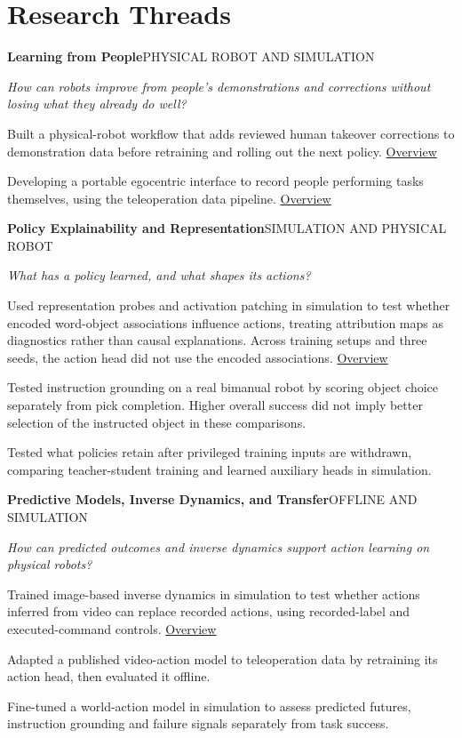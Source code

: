 \documentclass[10pt]{article}
\newcommand{\thread}[3]{\par\vspace{4pt}\textbf{#1}\hfill{\scriptsize #2}\par\textit{#3}\par}
\renewcommand{\evidence}[2]{\nobreak\hspace{0.15em}\mbox{\footnotesize\href{#1}{#2}}}
\begin{document}
\section{Research Threads}
\thread{Learning from People}{PHYSICAL ROBOT AND SIMULATION}{How can robots improve from people's demonstrations and corrections without losing what they already do well?}
\begin{compactitems}
\item Built a physical-robot workflow that adds reviewed human takeover corrections to demonstration data before retraining and rolling out the next policy. \evidence{https://tvpian.github.io/\#continual-learning}{Overview}
\item Developing a portable egocentric interface to record people performing tasks themselves, using the teleoperation data pipeline. \evidence{https://tvpian.github.io/\#egocentric}{Overview}
\end{compactitems}
\thread{Policy Explainability and Representation}{SIMULATION AND PHYSICAL ROBOT}{What has a policy learned, and what shapes its actions?}
\begin{compactitems}
\item Used representation probes and activation patching in simulation to test whether encoded word-object associations influence actions, treating attribution maps as diagnostics rather than causal explanations. Across training setups and three seeds, the action head did not use the encoded associations. \evidence{https://tvpian.github.io/\#explainability}{Overview}
\item Tested instruction grounding on a real bimanual robot by scoring object choice separately from pick completion. Higher overall success did not imply better selection of the instructed object in these comparisons.
\item Tested what policies retain after privileged training inputs are withdrawn, comparing teacher-student training and learned auxiliary heads in simulation.
\end{compactitems}
\thread{Predictive Models, Inverse Dynamics, and Transfer}{OFFLINE AND SIMULATION}{How can predicted outcomes and inverse dynamics support action learning on physical robots?}
\begin{compactitems}
\item Trained image-based inverse dynamics in simulation to test whether actions inferred from video can replace recorded actions, using recorded-label and executed-command controls. \evidence{https://tvpian.github.io/\#world-models}{Overview}
\item Adapted a published video-action model to teleoperation data by retraining its action head, then evaluated it offline.
\item Fine-tuned a world-action model in simulation to assess predicted futures, instruction grounding and failure signals separately from task success.
\end{compactitems}
\end{document}
